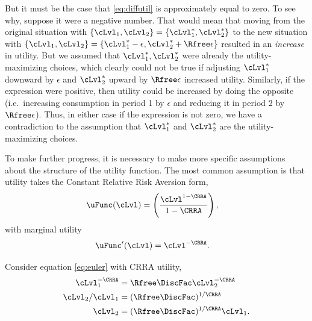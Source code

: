 \documentclass{scrartcl}
\begin{document}
  But it must be the case that \eqref{eq:diffutil} is approximately equal to zero.
  To see why, suppose it were a negative number.
  That would mean that moving from the original situation with $\{\cLvl_{1},\cLvl_{2}\} = \{\cLvl_{1}^{*},\cLvl_{2}^{*}\}$ to the new situation with $\{\cLvl_{1},\cLvl_{2}\} = \{\cLvl_{1}^{*}-\epsilon,\cLvl_{2}^{*}+\Rfree\epsilon\}$ resulted in an \textit{ increase} in utility.
  But we assumed that $\cLvl_{1}^{*},\cLvl_{2}^{*}$ were already the utility-maximizing choices, which clearly could not be true if adjusting $\cLvl_{1}^{*}$ downward by $\epsilon$ and $\cLvl^{*}_{2}$ upward by $\Rfree \epsilon$ increased utility.
  Similarly, if the expression were positive, then utility could be increased by doing the opposite (i.e.\ increasing consumption in period 1 by $\epsilon$ and reducing it in period 2 by $\Rfree\epsilon$).
  Thus, in either case if the expression is not zero, we have a contradiction to the assumption that $\cLvl_{1}^{*}$ and $\cLvl_{2}^{*}$ are the utility-maximizing choices.

  To make further progress, it is necessary to make more specific assumptions about the structure of the utility function.
  The most common assumption is that utility takes the Constant Relative Risk Aversion form,
  \begin{equation}\begin{gathered}\begin{aligned} \uFunc(\cLvl) & = \left(\frac{\cLvl^{1-\CRRA}}{1-\CRRA}\right) \label{eq:crrautil},
      \end{aligned}\end{gathered}\end{equation} with marginal utility
  \begin{equation}\begin{gathered}\begin{aligned} \uFunc^{\prime}(\cLvl) & = \cLvl^{-\CRRA} \label{eq:crramargutil}.
      \end{aligned}\end{gathered}\end{equation}

  Consider equation \eqref{eq:euler} with CRRA utility,
  \begin{equation}\begin{gathered}\begin{aligned} \cLvl_{1}^{-\CRRA} & = \Rfree\DiscFac \cLvl_{2}^{-\CRRA} \\ \cLvl_{2}/\cLvl_{1} & = (\Rfree\DiscFac)^{1/\CRRA} \\ \cLvl_{2} & = (\Rfree\DiscFac)^{1/\CRRA}\cLvl_{1} \label{eq:c1euler}.
      \end{aligned}\end{gathered}\end{equation}
\end{document}

